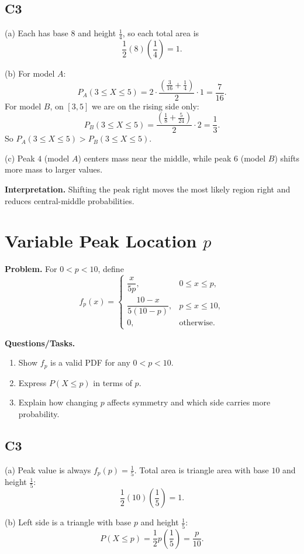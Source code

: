 \subsection*{C3}
(a) Each has base $8$ and height $\frac14$, so each total area is
\[
\frac12(8)\left(\frac14\right)=1.
\]

(b) For model $A$:
\[
P_A(3\le X\le 5)=2\cdot\frac{\left(\frac{3}{16}+\frac14\right)}{2}\cdot1=\frac{7}{16}.
\]
For model $B$, on $[3,5]$ we are on the rising side only:
\[
P_B(3\le X\le 5)=\frac{\left(\frac18+\frac{5}{24}\right)}{2}\cdot2=\frac13.
\]
So $P_A(3\le X\le 5)>P_B(3\le X\le 5)$.

(c) Peak $4$ (model $A$) centers mass near the middle, while peak $6$ (model $B$) shifts more mass to larger values.

\textbf{Interpretation.}
Shifting the peak right moves the most likely region right and reduces central-middle probabilities.

\section{Variable Peak Location $p$}

\textbf{Problem.}
For $0<p<10$, define
\[
f_p(x)=\begin{cases}
\dfrac{x}{5p}, & 0\le x\le p,\\
\dfrac{10-x}{5(10-p)}, & p\le x\le 10,\\
0, & \text{otherwise.}
\end{cases}
\]

\textbf{Questions/Tasks.}
\begin{enumerate}[label=(\alph*)]
\item Show $f_p$ is a valid PDF for any $0<p<10$.
\item Express $P(X\le p)$ in terms of $p$.
\item Explain how changing $p$ affects symmetry and which side carries more probability.
\end{enumerate}

\subsection*{C3}
(a) Peak value is always $f_p(p)=\frac15$.
Total area is triangle area with base $10$ and height $\frac15$:
\[
\frac12(10)\left(\frac15\right)=1.
\]

(b) Left side is a triangle with base $p$ and height $\frac15$:
\[
P(X\le p)=\frac12 p\left(\frac15\right)=\frac{p}{10}.
\]

